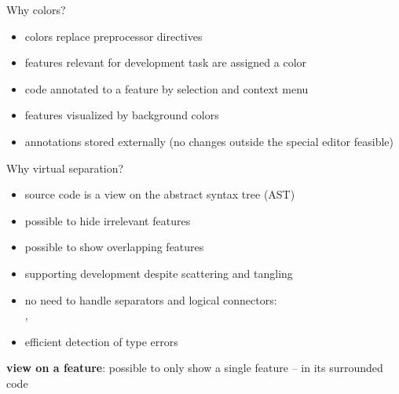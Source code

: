 \begin{frame}{\myframetitle\mysource{\cide}}
	\begin{mycolumns}[widths={70},animation=none]
	\mynextcolumn
		\begin{example}{Why colors?}
			\begin{itemize}
				\item colors replace preprocessor directives
				\item features relevant for development task are assigned a color
				\item code annotated to a feature by selection and context menu
				\item features visualized by background colors
				\item annotations stored externally (no changes outside the special editor feasible)
			\end{itemize}
		\end{example}
	\end{mycolumns}
\end{frame}

\begin{frame}{\myframetitle\mysource{\cide}}
	\begin{mycolumns}[widths={65},animation=none]
	\mynextcolumn
		\begin{example}{Why virtual separation?}
			\begin{itemize}
				\item source code is a view on the abstract syntax tree (AST)
				\item possible to hide irrelevant features
				\item possible to show overlapping features
				\item supporting development despite scattering and tangling
				\item no need to handle separators and logical connectors:\\\mycite{\texttt{,}}, \mycite{\texttt{||}}
				\item efficient detection of type errors\mysource{\lectureanalyses}
			\end{itemize}
		\end{example}
	\end{mycolumns}
\end{frame}

\begin{frame}{\myframetitle\mysource{\cide}}
	\begin{example}{}\centering
		\textbf{view on a feature}: possible to only show a single feature -- in its surrounded code
	\end{example}
\end{frame}

